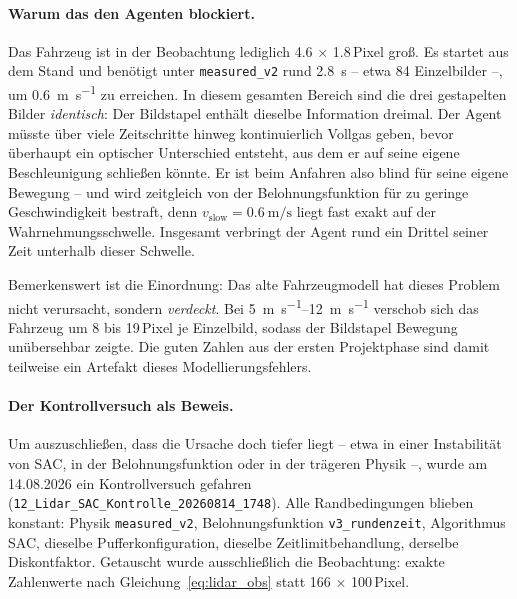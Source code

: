 \paragraph{Warum das den Agenten blockiert.}
Das Fahrzeug ist in der Beobachtung lediglich \num{4.6} $\times$ \num{1.8}\,Pixel groß. Es startet aus dem Stand und benötigt unter \texttt{measured\_v2} rund \SI{2.8}{\second} -- etwa \num{84} Einzelbilder --, um \SI{0.6}{\meter\per\second} zu erreichen. In diesem gesamten Bereich sind die drei gestapelten Bilder \emph{identisch}: Der Bildstapel enthält dieselbe Information dreimal. Der Agent müsste über viele Zeitschritte hinweg kontinuierlich Vollgas geben, bevor überhaupt ein optischer Unterschied entsteht, aus dem er auf seine eigene Beschleunigung schließen könnte. Er ist beim Anfahren also blind für seine eigene Bewegung -- und wird zeitgleich von der Belohnungsfunktion für zu geringe Geschwindigkeit bestraft, denn $v_{\text{slow}} = \SI{0.6}{\meter\per\second}$ liegt fast exakt auf der Wahrnehmungsschwelle. Insgesamt verbringt der Agent rund ein Drittel seiner Zeit unterhalb dieser Schwelle.

Bemerkenswert ist die Einordnung: Das alte Fahrzeugmodell hat dieses Problem nicht verursacht, sondern \emph{verdeckt}. Bei \SIrange{5}{12}{\meter\per\second} verschob sich das Fahrzeug um \num{8} bis \num{19}\,Pixel je Einzelbild, sodass der Bildstapel Bewegung unübersehbar zeigte. Die guten Zahlen aus der ersten Projektphase sind damit teilweise ein Artefakt dieses Modellierungsfehlers.

\paragraph{Der Kontrollversuch als Beweis.}
\label{sec:kontrollversuch}
Um auszuschließen, dass die Ursache doch tiefer liegt -- etwa in einer Instabilität von \ac{SAC}, in der Belohnungsfunktion oder in der trägeren Physik --, wurde am 14.08.2026 ein Kontrollversuch gefahren (\texttt{12\_Lidar\_SAC\_Kontrolle\_20260814\_1748}). Alle Randbedingungen blieben konstant: Physik \texttt{measured\_v2}, Belohnungsfunktion \texttt{v3\_rundenzeit}, Algorithmus \ac{SAC}, dieselbe Pufferkonfiguration, dieselbe Zeitlimitbehandlung, derselbe Diskontfaktor. Getauscht wurde ausschließlich die Beobachtung: exakte Zahlenwerte nach Gleichung~\eqref{eq:lidar_obs} statt \num{166} $\times$ \num{100}\,Pixel.

